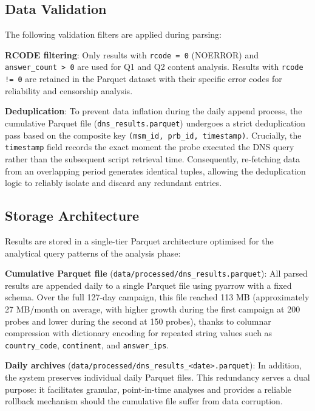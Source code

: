 \subsection{Data Validation}
\label{subsec:3.4.3}

The following validation filters are applied during parsing:

\textbf{RCODE filtering}: Only results with \texttt{rcode = 0} (NOERROR) and \texttt{answer\_count > 0} are used for Q1 and Q2 content analysis. Results with \texttt{rcode != 0} are retained in the Parquet dataset with their specific error codes for reliability and censorship analysis.

\textbf{Deduplication}: To prevent data inflation during the daily append process, the cumulative Parquet file (\texttt{dns\_results.parquet}) undergoes a strict deduplication pass based on the composite key \texttt{(msm\_id, prb\_id, timestamp)}. Crucially, the \texttt{timestamp} field records the exact moment the probe executed the \ac{DNS} query rather than the subsequent script retrieval time. Consequently, re-fetching data from an overlapping period generates identical tuples, allowing the deduplication logic to reliably isolate and discard any redundant entries.

\subsection{Storage Architecture}
\label{subsec:3.4.4}

Results are stored in a single-tier Parquet architecture optimised for the analytical query patterns of the analysis phase:

\textbf{Cumulative Parquet file} (\texttt{data/processed/dns\_results.parquet}): All parsed results are appended daily to a single Parquet file using pyarrow with a fixed schema. Over the full 127-day campaign, this file reached 113 MB (approximately 27 MB/month on average, with higher growth during the first campaign at 200 probes and lower during the second at 150 probes), thanks to columnar compression with dictionary encoding for repeated string values such as \texttt{country\_code}, \texttt{continent}, and \texttt{answer\_ips}.

\textbf{Daily archives} (\texttt{data/processed/dns\_results\_<date>.parquet}): In addition, the system preserves individual daily Parquet files. This redundancy serves a dual purpose: it facilitates granular, point-in-time analyses and provides a reliable rollback mechanism should the cumulative file suffer from data corruption.

